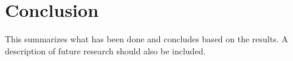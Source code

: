 \begin{comment}
Important points:

* Non-interactive
* Computationally/Unconditionally secure
* No central trusted party
* Shuffled send
* Security goals: integrity, anonymity, accountability (See dissent 2.3)
* Attack model (dissent 2.3)
* Assumptions, highlight difference between them (Faulty nodes never silent, ..., dissent 2.4)

Sections:

* 88: Base protocol
* 89: Disco (unconditional untraceability, computationally secure serviceability)
* 89: Waidner (Unreliable channel)
* 90: Detection of disruptors
* (03: Herbivore)
* 03: k-anonymity (maybe this is related work instead? weakens security goals to gain efficiency). Small DC subnets.
* 04: dc-revisited (proactive accountability. efficient cheater detection + recovery)
* 10: Dissent
* 13: Verdict

Definitions:

* Anonymity set
* Anonymity terms (cite def paper)
* Anonymity game (dissent [7])
* k-anonymity (k-anonymity)
* Robustness? (k-anonymity 3.3)
* (Partial, Full) Collusion
* Disruption
* Anytrust assumption
* Zero knowledge proofs

Attacks:

* Sybil (dissent [17])
* Sock puppetry (dissent [36])
* Traffic analysis (verdict [4, 34, 38])

Related work:

* Mix nets
* Crowds (dissent [29])
* CliqueNet (k-anon [17])
* Verifiable shuffles
* Group signatures, ring signatures
* Herbivore

Random notes:

* k-anonymous provide anonymity only when most members are honest (see dissent, related work)
* Herbivore provides anonymity only within small subgroups

\end{comment}

\section{Conclusion}

This summarizes what has been done and concludes based on the results. A description of future research should also be included.
